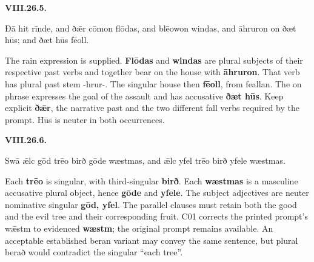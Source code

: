 \par\begin{minipage}{\linewidth}\raggedright
\textbf{VIII.26.5.}

Ðā hit rīnde, and ðǣr cōmon flōdas, and blēowon windas, and āhruron on ðæt hūs; and ðæt hūs fēoll.

The rain expression is supplied. \textbf{Flōdas} and \textbf{windas} are plural subjects of their respective past verbs and together bear on the house with \textbf{āhruron}. That verb has plural past stem -hrur-. The singular house then \textbf{fēoll}, from feallan. The on phrase expresses the goal of the assault and has accusative \textbf{ðæt hūs}. Keep explicit \textbf{ðǣr}, the narrative past and the two different fall verbs required by the prompt. Hūs is neuter in both occurrences.

\end{minipage}\par\addvspace{4pt}

\par\begin{minipage}{\linewidth}\raggedright
\textbf{VIII.26.6.}

Swā ǣlc gōd trēo birð gōde wæstmas, and ǣlc yfel trēo birð yfele wæstmas.

Each \textbf{trēo} is singular, with third-singular \textbf{birð}. Each \textbf{wæstmas} is a masculine accusative plural object, hence \textbf{gōde} and \textbf{yfele}. The subject adjectives are neuter nominative singular \textbf{gōd, yfel}. The parallel clauses must retain both the good and the evil tree and their corresponding fruit. C01 corrects the printed prompt's wǣstm to evidenced \textbf{wæstm}; the original prompt remains available. An acceptable established beran variant may convey the same sentence, but plural berað would contradict the singular “each tree”.

\end{minipage}\par\addvspace{4pt}

